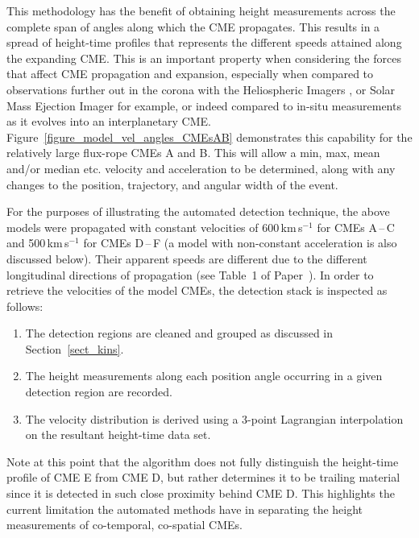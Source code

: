 \documentclass[preprint2]{aastex}
\newcommand{\RNum}[1]{\uppercase\expandafter{\romannumeral #1\relax}}
\begin{document}
This methodology has the benefit of obtaining height measurements across the complete span of angles along which the CME propagates. This results in a spread of height-time profiles that represents the different speeds attained along the expanding CME. This is an important property when considering the forces that affect CME propagation and expansion, especially when compared to observations further out in the corona with the Heliospheric Imagers \citep[HI;][]{2009SoPh..254..387E}, or Solar Mass Ejection Imager \citep[SMEI;][]{2004SoPh..225..177J} for example, or indeed compared to in-situ measurements as it evolves into an interplanetary CME. Figure~\ref{figure_model_vel_angles_CMEsAB} demonstrates this capability for the relatively large flux-rope CMEs A and B. This will allow a min, max, mean and/or median etc. velocity and acceleration to be determined, along with any changes to the position, trajectory, and angular width of the event.

For the purposes of illustrating the automated detection technique, the above models were propagated with constant velocities of 600\,km\,s$^{-1}$ for CMEs A\,--\,C and 500\,km\,s$^{-1}$ for CMEs D\,--\,F (a model with non-constant acceleration is also discussed below). Their apparent speeds are different due to the different longitudinal directions of propagation (see Table~1 of Paper~\RNum{1}). In order to retrieve the velocities of the model CMEs, the detection stack is inspected as follows:
\begin{enumerate}
\item The detection regions are cleaned and grouped as discussed in Section~\ref{sect_kins}.
\item The height measurements along each position angle occurring in a given detection region are recorded.
\item The velocity distribution is derived using a 3-point Lagrangian interpolation on the resultant height-time data set.
\end{enumerate}
Note at this point that the algorithm does not fully distinguish the height-time profile of CME E from CME D, but rather determines it to be trailing material since it is detected in such close proximity behind CME D. This highlights the current limitation the automated methods have in separating the height measurements of co-temporal, co-spatial CMEs.
\end{document}

